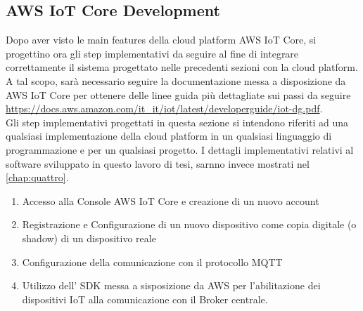 \subsection{AWS IoT Core Development}
\label{subsec:aws_dev}
Dopo aver visto le main features della cloud platform AWS IoT Core, si progettino ora gli step implementativi da seguire al fine di integrare correttamente il sistema progettato nelle precedenti sezioni con la cloud platform.
A tal scopo, sarà necessario seguire la documentazione messa a disposizione da AWS IoT Core per ottenere delle linee guida più dettagliate sui passi da seguire \url{https://docs.aws.amazon.com/it_it/iot/latest/developerguide/iot-dg.pdf}.\\
Gli step implementativi progettati in questa sezione si intendono riferiti ad una qualsiasi implementazione della cloud platform in un qualsiasi linguaggio di programmazione e per un qualsiasi progetto. I dettagli implementativi relativi al software sviluppato in questo lavoro di tesi, sarnno invece mostrati nel \autoref{chap:quattro}.\\
\begin{enumerate}
	\item Accesso alla Console AWS IoT Core e creazione di un nuovo account
	\item Registrazione e Configurazione di un nuovo dispositivo come copia digitale (o shadow) di un dispositivo reale
	\item Configurazione della comunicazione con il protocollo MQTT
	\item Utilizzo dell' SDK messa a sisposizione da AWS per l'abilitazione dei dispositivi IoT alla comunicazione con il Broker centrale.
\end{enumerate}

